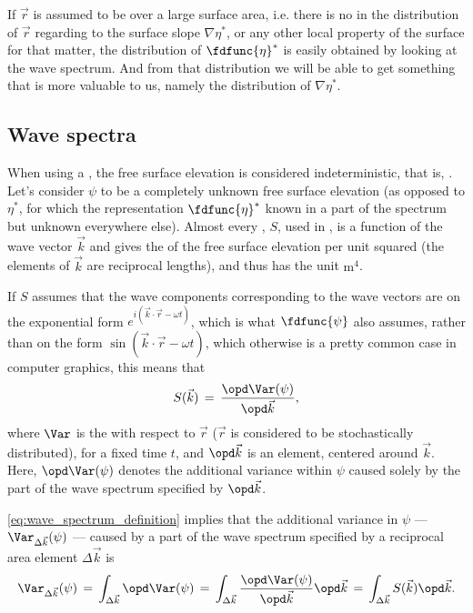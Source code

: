 If $\vec{r}$ is assumed to be  over a large surface area, i.e. there is no \bias in the distribution of $\vec{r}$ regarding to the surface slope $\nabla\eta^*$, or any other local property of the surface for that matter, the distribution of $\fdfunc{\eta}^*$ is easily obtained by looking at the wave spectrum. And from that distribution we will be able to get something that is more valuable to us, namely the distribution of $\nabla\eta^*$.

\subsection{Wave spectra}

When using a , the free surface elevation is considered indeterministic, that is, \stochastic. Let's consider $\psi$ to be a completely unknown free surface elevation (as opposed to $\eta^*$, for which the  representation $\fdfunc{\eta}^*$ known in a part of the spectrum but unknown everywhere else). Almost every , $S$, used in , is a function of the wave vector $\vec{k}$ and gives the \variance of the free surface elevation per unit  squared (the elements of $\vec{k}$ are reciprocal lengths), and thus has the unit $\text{m}^4$. 

If $S$ assumes that the wave components corresponding to the wave vectors are on the exponential form $e^{i(\vec{k}\cdot\vec{r}-\omega t)}$, which is what $\fdfunc{\psi}$ also assumes, rather than on the \sinusoidal form $\sin(\vec{k}\cdot\vec{r}-\omega t)$, which otherwise is a pretty common case in computer graphics, this means that
%
\begin{equation} \label{eq:wave_spectrum_definition}
S(\vec{k}) \,=\, \frac{\opd \Var(\psi)}{\opd\vec{k}},
\end{equation}
%
where $\Var$ is the  with respect to $\vec{r}$ ($\vec{r}$ is considered to be stochastically distributed), for a fixed time $t$, and $\opd\vec{k}$ is an \infinitesimal {} element, centered around $\vec{k}$. Here, $\opd\Var(\psi)$ denotes the additional variance within $\psi$ caused solely by the part of the wave spectrum specified by $\opd\vec{k}$.

\eqref{eq:wave_spectrum_definition} implies that the additional variance in $\psi$ --- $\Var_{\Delta\vec{k}}(\psi)$ --- caused by a part of the wave spectrum specified by a reciprocal area element $\Delta\vec{k}$ is
%
\begin{equation} \label{eq:variance_k_eta}
\Var_{\Delta\vec{k}}(\psi) \,=\, \int_{\Delta\vec{k}}\opd \Var(\psi) \,=\, \int_{\Delta\vec{k}}\frac{\opd \Var(\psi)}{\opd\vec{k}}\opd\vec{k} \,=\, \int_{\Delta\vec{k}}S(\vec{k})\opd\vec{k}.
\end{equation}


